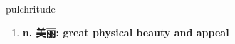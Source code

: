 
\begin{frame}
{\huge pulchritude}
\begin{center}
\begin{enumerate}\Large
  \item \textbf{n. 美丽: great physical beauty and appeal}
\end{enumerate}
\end{center}
\end{frame}
